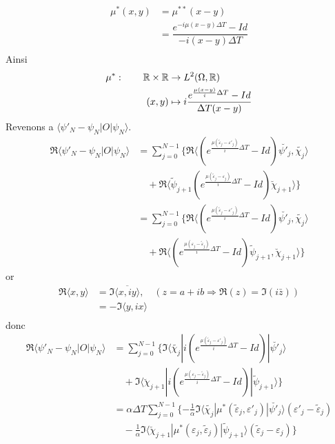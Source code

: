 \begin{align*}
\mu^{*}(x,y) 
&= \mu ^{**}(x-y)\\
&= \dfrac{e^{-i\mu (x-y)\Delta T}-Id}{-i(x-y)\Delta T}\\
\end{align*}
Ainsi
\begin{equation} \label{mustar}
\begin{aligned}
\mu^* :\quad \quad \mathbb R \times \mathbb R &\rightarrow L^2(\Omega, \mathbb R) \\(x,y)&\mapsto i\dfrac{e^{\frac{\mu (x-y)}{i}\Delta T }-Id}{\Delta T (x-y)}
\end{aligned}
\end{equation}
Revenons a $\langle \psi'_N-\psi_N |O|\psi_N \rangle$.
\begin{align*}
\Re\langle \psi'_N-\psi_N |O|\psi_N \rangle 
&= \sum_{j=0}^{N-1} \{\Re\langle (e^{\frac{\mu(\tilde{\varepsilon}_j-\varepsilon'_j)}{i}\Delta T}-Id)\breve{\psi'_j} , \tilde{\chi_j} \rangle\\
&\quad + \Re\langle \tilde{\psi}_{j+1} (e^{\frac{\mu(\tilde{\varepsilon}_j-\varepsilon_j)}{i}\Delta T}-Id)\breve{\chi}_{j+1} \rangle \}\\
&= \sum_{j=0}^{N-1} \{\Re\langle (e^{\frac{\mu(\tilde{\varepsilon}_j-\varepsilon'_j)}{i}\Delta T}-Id)\breve{\psi'_j} , \tilde{\chi_j} \rangle\\
&\quad + \Re\langle (e^{\frac{\mu(\varepsilon_j-\tilde{\varepsilon}_j)}{i}\Delta T}-Id) \tilde{\psi}_{j+1} , \breve{\chi}_{j+1} \rangle \}
\end{align*}
or
\begin{align*}
\Re \langle x,y \rangle 
&= \Im \overline{\langle x,iy \rangle}, \quad (z=a+ib \Rightarrow \Re(z)=\Im(i\bar{z}))\\
&= -\Im \langle y,ix \rangle\\
\end{align*}
donc
\begin{align*}
\Re\langle \psi'_N-\psi_N |O|\psi_N \rangle 
&= \sum_{j=0}^{N-1} \{\Im\langle \tilde{\chi_j} |i(e^{\frac{\mu(\tilde{\varepsilon}_j-\varepsilon'_j)}{i}\Delta T}-Id)| \breve{\psi'_j} \rangle\\
&\quad + \Im\langle \breve{\chi}_{j+1} |i(e^{\frac{\mu(\varepsilon_j-\tilde{\varepsilon}_j)}{i}\Delta T}-Id)| \tilde{\psi}_{j+1} \rangle \}\\
&= \alpha \Delta T\sum_{j=0}^{N-1} \{ -\frac{1}{\alpha}\Im\langle \tilde{\chi_j} |\mu^{*}(\tilde{\varepsilon}_j,\varepsilon'_j)| \breve{\psi'_j} \rangle (\varepsilon'_j-\tilde{\varepsilon}_j)\\
&\quad -\frac{1}{\alpha} \Im\langle \breve{\chi}_{j+1} |\mu^{*}(\varepsilon_j,\tilde{\varepsilon}_j)| \tilde{\psi}_{j+1} \rangle (\tilde{\varepsilon}_j-\varepsilon_j) \}
\end{align*}
